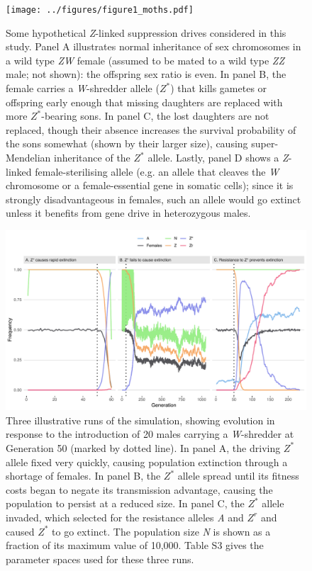 \documentclass[]{rsos}%
\begin{document}
\begin{figure}[h]
\centering
\texttt{[image: ../figures/figure1\_moths.pdf]}
\caption{\footnotesize{Some hypothetical \textit{Z}-linked suppression drives considered in this study. Panel A illustrates normal inheritance of sex chromosomes in a wild type \textit{ZW} female (assumed to be mated to a wild type \textit{ZZ} male; not shown): the offspring sex ratio is even. In panel B, the female carries a \textit{W}-shredder allele ($Z^*$) that kills gametes or offspring early enough that missing daughters are replaced with more $Z^*$-bearing sons. In panel C, the lost daughters are not replaced, though their absence increases the survival probability of the sons somewhat (shown by their larger size), causing super-Mendelian inheritance of the $Z^*$ allele. Lastly, panel D shows a \textit{Z}-linked female-sterilising allele (e.g. an allele that cleaves the \textit{W} chromosome or a female-essential gene in somatic cells); since it is strongly disadvantageous in females, such an allele would go extinct unless it benefits from gene drive in heterozygous males.}}
\end{figure}
\newpage

\begin{figure}[h]
\centering
\includegraphics[width=1.0\textwidth]{../figures/figure2.pdf}
\caption{\footnotesize{Three illustrative runs of the simulation, showing evolution in response to the introduction of 20 males carrying a \textit{W}-shredder at Generation 50 (marked by dotted line). In panel A, the driving $Z^*$ allele fixed very quickly, causing population extinction through a shortage of females. In panel B, the $Z^*$ allele spread until its fitness costs began to negate its transmission advantage, causing the population to persist at a reduced size. In panel C, the $Z^*$ allele invaded, which selected for the resistance alleles \textit{A} and $Z^r$ and caused $Z^*$ to go extinct. The population size \textit{N} is shown as a fraction of its maximum value of 10,000. Table S3 gives the parameter spaces used for these three runs.}}
\end{figure}
\newpage
\end{document}
